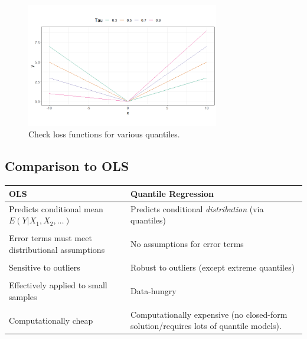 \documentclass[12pt]{../notes}
\begin{document}
\begin{figure}[H]
\centering
\includegraphics[width=0.75\textwidth]{../figures/module7/checkloss.png}
\caption{Check loss functions for various quantiles.}
\label{fig:checkloss}
\end{figure}

\subsection{Comparison to OLS}
\begin{tabular}{|p{9cm}|p{9cm}|}
\hline
\textbf{OLS} & \textbf{Quantile Regression} \\ 
\hline
Predicts conditional mean $E(Y|X_1, X_2, \ldots)$ & Predicts conditional \textit{distribution} (via quantiles) \\
& \\
Error terms must meet distributional assumptions & No assumptions for error terms \\
& \\
Sensitive to outliers  & Robust to outliers (except extreme quantiles) \\
& \\
Effectively applied to small samples & Data-hungry \\
& \\
Computationally cheap & Computationally expensive (no closed-form solution/requires lots of quantile models). \\
\hline
\end{tabular}

\end{document}
